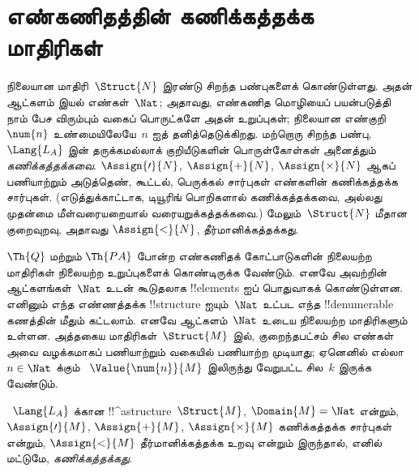 \documentclass[../../../include/open-logic-section]{subfiles}
\begin{document}

\section{எண்கணிதத்தின் கணிக்கத்தக்க மாதிரிகள்}

\begin{explain}
நிலையான மாதிரி~$\Struct{N}$ இரண்டு சிறந்த பண்புகளைக் கொண்டுள்ளது.
அதன் ஆட்களம் இயல் எண்கள்~$\Nat$; அதாவது, எண்கணித மொழியைப் பயன்படுத்தி
நாம் பேச விரும்பும் வகைப் பொருட்களே அதன் உறுப்புகள்; நிலையான
எண்குறி~$\num{n}$ உண்மையிலேயே~$n$ ஐத் தனித்தெடுக்கிறது. மற்றொரு
சிறந்த பண்பு,~$\Lang{L_A}$ இன் தருக்கமல்லாக் குறியீடுகளின் பொருள்கோள்கள்
அனைத்தும் \emph{கணிக்கத்தக்கவை}. $\Assign{\prime}{N}$,
$\Assign{+}{N}$, $\Assign{\times}{N}$ ஆகப் பணியாற்றும் அடுத்தெண்,
கூட்டல், பெருக்கல் சார்புகள் எண்களின் கணிக்கத்தக்க சார்புகள்.
(எடுத்துக்காட்டாக, டியூரிங் பொறிகளால் கணிக்கத்தக்கவை, அல்லது முதன்மை
மீள்வரையறையால் வரையறுக்கத்தக்கவை.) மேலும்~$\Struct{N}$ மீதான
குறைவுறவு, அதாவது $\Assign{<}{N}$, தீர்மானிக்கத்தக்கது.

$\Th{Q}$ மற்றும் $\Th{PA}$ போன்ற எண்கணிதக் கோட்பாடுகளின் நிலையற்ற
மாதிரிகள் நிலையற்ற உறுப்புகளைக் கொண்டிருக்க வேண்டும். எனவே அவற்றின்
ஆட்களங்கள்~$\Nat$ உடன் கூடுதலாக !!{element}s ஐப் பொதுவாகக் கொண்டுள்ளன.
எனினும் எந்த எண்ணத்தக்க !!{structure} ஐயும்~$\Nat$ உட்பட எந்த
!!{denumerable} கணத்தின் மீதும் கட்டலாம். எனவே ஆட்களம்~$\Nat$ உடைய
நிலையற்ற மாதிரிகளும் உள்ளன. அத்தகைய மாதிரிகள்~$\Struct{M}$ இல்,
குறைந்தபட்சம் சில எண்கள் அவை வழக்கமாகப் பணியாற்றும் வகையில் பணியாற்ற
முடியாது; ஏனெனில் எல்லா~$n \in \Nat$ க்கும்
~$\Value{\num{n}}{M}$ இலிருந்து வேறுபட்ட சில~$k$ இருக்க வேண்டும்.
\end{explain}

\begin{defn}
~$\Lang{L_A}$ க்கான !!^a{structure}~$\Struct{M}$,
$\Domain{M} = \Nat$ என்றும், $\Assign{\prime}{M}$, $\Assign{+}{M}$,
$\Assign{\times}{M}$ கணிக்கத்தக்க சார்புகள் என்றும்,
$\Assign{<}{M}$ தீர்மானிக்கத்தக்க உறவு என்றும் இருந்தால், எனில்
மட்டுமே, \emph{கணிக்கத்தக்கது}.
\end{defn}
\end{document}
